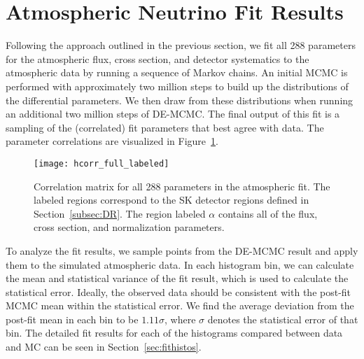 

\section{Atmospheric Neutrino Fit Results}
\label{sec:fitresults}

Following the approach outlined in the previous section, we fit all 288
parameters for the atmospheric flux, cross section, and detector systematics to
the atmospheric data by running a sequence of Markov chains.  An initial MCMC is
performed with approximately two million steps to build up the distributions of
the differential parameters.  We then draw from these distributions when running
an additional two million steps of DE-MCMC\@.  The final output of this fit is 
a sampling of the (correlated) fit parameters that best agree with data. The parameter
correlations are visualized in Figure~\ref{fig:fitcorr}.

\begin{figure}[h]
  \begin{center}
    \texttt{[image: hcorr\_full\_labeled]}
  \end{center}
  \caption{Correlation matrix for all 288 parameters in the atmospheric fit.
  The labeled regions correspond to the SK detector regions defined in
  Section~\ref{subsec:DR}.  The region labeled $\alpha$ contains all of the
  flux, cross section, and normalization parameters.}
  \label{fig:fitcorr}
\end{figure}

To analyze the fit results, we
sample points from the DE-MCMC result and apply them to the simulated
atmospheric data\@.  In each histogram bin, we can calculate the mean and
statistical variance of the fit result, which is used to calculate the
statistical error.  Ideally, the observed data should be consistent with the
post-fit MCMC mean within the statistical error.  We find the average deviation
from the post-fit mean in each bin to be $1.11\sigma$, where $\sigma$ denotes
the statistical error of that bin.  The detailed fit results for each of the
histograms compared between data and MC can be seen in Section~\ref{sec:fithistos}.



